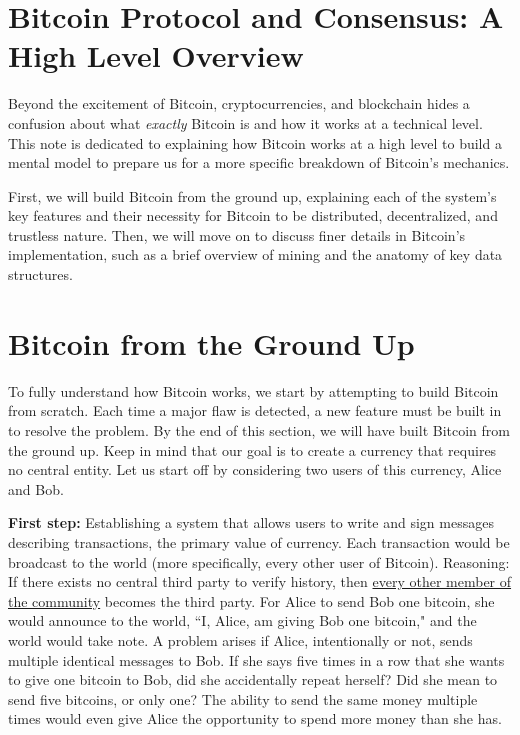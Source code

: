 \documentclass[11pt]{article}
\begin{document}
    \thispagestyle{firstpage}
    \vspace*{2\baselineskip}
    \section*{Bitcoin Protocol and Consensus: A High Level Overview}
    
    Beyond the excitement of Bitcoin, cryptocurrencies, and blockchain hides a confusion about what \textit{exactly} Bitcoin is and how it works at a technical level. This note is dedicated to explaining how Bitcoin works at a high level to build a mental model to prepare us for a more specific breakdown of Bitcoin's mechanics. 
    
    First, we will build Bitcoin from the ground up, explaining each of the system's key features and their necessity for Bitcoin to be distributed, decentralized, and trustless nature. Then, we will move on to discuss finer details in Bitcoin's implementation, such as a brief overview of mining and the anatomy of key data structures.
    
    \section*{Bitcoin from the Ground Up}
    
    To fully understand how Bitcoin works, we start by attempting to build Bitcoin from scratch. Each time a major flaw is detected, a new feature must be built in to resolve the problem. By the end of this section, we will have built Bitcoin from the ground up. Keep in mind that our goal is to create a currency that requires no central entity. Let us start off by considering two users of this currency, Alice and Bob.
    
    \textbf{First step:} Establishing a system that allows users to write and sign messages describing transactions, the primary value of currency. Each transaction would be broadcast to the world (more specifically, every other user of Bitcoin). Reasoning: If there exists no central third party to verify history, then \underline{every other member of the community} becomes the third party. For Alice to send Bob one bitcoin, she would announce to the world, ``I, Alice, am giving Bob one bitcoin," and the world would take note. A problem arises if Alice, intentionally or not, sends multiple identical messages to Bob. If she says five times in a row that she wants to give one bitcoin to Bob, did she accidentally repeat herself? Did she mean to send five bitcoins, or only one? The ability to send the same money multiple times would even give Alice the opportunity to spend more money than she has. 
    
\end{document}
